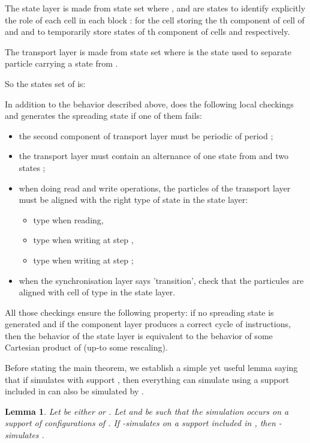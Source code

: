 \documentclass[a4paper]{elsarticle}
\def\qed{\relax\ifmmode\hskip2em \blacksquare\else\unskip\nobreak\hfill\hskip1em \fi}
\newtheorem{lm}{Lemma}[section]
\begin{document}
The state layer is made from state set  where
,  and  are states to identify explicitly the role of each
cell in each block :  for the cell storing the th
component of cell  of  and  and  to temporarily store
states of th component of cells  and  respectively.

The transport layer is made from state set 
where  is the state used to separate particle carrying a state
from .

So the states set of  is:
 

In addition to the behavior described above,  does the
following local checkings and generates the spreading state 
if one of them fails:
\begin{itemize}
\item the second component of transport layer must be periodic of period ;
\item the transport layer must contain an alternance of one state from
   and two states ;
\item when doing read and write operations, the particles of the
  transport layer must be aligned with the right type of state in the state layer:
  \begin{itemize}
  \item type  when reading,
  \item type  when writing at step ,
  \item type  when writing at step ;
  \end{itemize}
\item when the synchronisation layer says 'transition', check that the
  particules are aligned with cell of type  in the state layer.
\end{itemize}

All those checkings ensure the following property: if no spreading
state is generated and if the component layer produces a correct cycle
of instructions, then the behavior of the state layer is equivalent
to the behavior of some Cartesian product of  (up-to some
rescaling).

Before stating the main theorem, we establish a simple yet useful
lemma saying that if  simulates  with support , then
everything  can simulate using a support included in  can
also be simulated by .


\begin{lm}
  \label{lm:lift}
  Let  be either  or .  Let  and
   be such that the simulation  occurs on a
  support  of configurations of . If  -simulates
   on a support included in , then  -simulates
  .
\end{lm}
\end{document}
